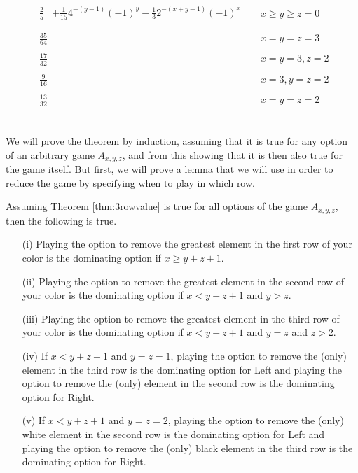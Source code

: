 \begin{thm}
\begin{subequations}
\begin{align}
\\
\label{eq:3row11}
\begin{split}
\frac{2}{5}&+\frac{1}{15}4^{-(y-1)}(-1)^y-\frac{1}{3}2^{-(x+y-1)}(-1)^x\\
\end{split}
&&x\ge y\ge z=0
\\
\label{eq:3row15}
\begin{split}
\frac{35}{64}
\end{split}
&&x=y=z=3
\\
\label{eq:3row14}
\begin{split}
\frac{17}{32}
\end{split}
&&x=y=3,z=2
\\
\label{eq:3row13}
\begin{split}
\frac{9}{16}
\end{split}
&&x=3,y=z=2
\\
\label{eq:3row12}
\begin{split}
\frac{13}{32}
\end{split}
&&x=y=z=2
\end{align}
\end{subequations}
\end{thm}
~\\
We will prove the theorem by induction, assuming that it is true for any option of an arbitrary game $A_{x,y,z}$, and from this showing that it is then also true for the game itself. But first, we will prove a lemma that we will use in order to reduce the game by specifying when to play in which row.
\begin{lem}
Assuming Theorem \ref{thm:3rowvalue} is true for all options of the game $A_{x,y,z}$, then the following is true.
\begin{itemize}
\item[(i)]Playing the option to remove the greatest element in the first row of your color is the dominating option if $x\ge y+z+1$.
\item[(ii)]Playing the option to remove the greatest element in the second row of your color is the dominating option if $x<y+z+1$ and $y>z$.
\item[(iii)]Playing the option to remove the greatest element in the third row of your color is the dominating option if $x<y+z+1$ and $y=z$ and $z>2$.
\item[(iv)]If $x<y+z+1$ and $y=z=1$, playing the option to remove the (only) element in the third row is the dominating option for Left and playing the option to remove the (only) element in the second row is the dominating option for Right.
\item[(v)]If $x<y+z+1$ and $y=z=2$, playing the option to remove the (only) white element in the second row is the dominating option for Left and playing the option to remove the (only) black element in the third row is the dominating option for Right.
\end{itemize}
\label{lem:rowopt}

\end{lem}
